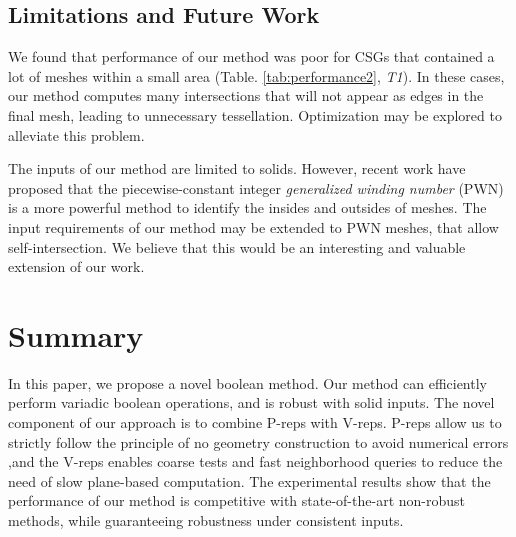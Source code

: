 \subsection{Limitations and Future Work}

We found that performance of our method was poor for CSGs that contained a lot of meshes within a small area (Table. \ref{tab:performance2}, \emph{T1}). In these cases, our method computes many intersections that will not appear as edges in the final mesh, leading to unnecessary tessellation. Optimization may be explored to alleviate this problem.

The inputs of our method are limited to solids. However, recent work \cite{zhou2016mesh} have proposed that the piecewise-constant integer \emph{generalized winding number} (PWN) is a more powerful method to identify the insides and outsides of meshes. The input requirements of our method may be extended to PWN meshes, that allow self-intersection. We believe that this would be an interesting and valuable extension of our work.

\section{Summary}

In this paper, we propose a novel boolean method. Our method can efficiently perform variadic boolean operations, and is robust with solid inputs. The novel component of our approach is to combine P-reps with V-reps. P-reps allow us to strictly follow the principle of no geometry construction to avoid numerical errors ,and the V-reps enables coarse tests and fast neighborhood queries to reduce the need of slow plane-based computation. The experimental results show that the performance of our method is competitive with state-of-the-art non-robust methods, while guaranteeing robustness under consistent inputs.
